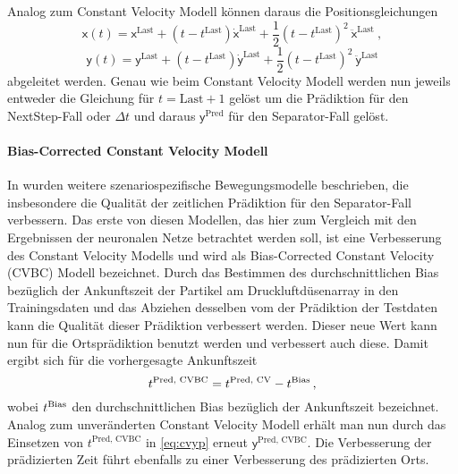 Analog zum Constant Velocity Modell können daraus die Positionsgleichungen 
% 
\begin{equation*}
    \mathsf{x}(t) = \mathsf{x}^{\text{Last}} + (t - t^{\text{Last}})\dot{\mathsf{x}}^{\text{Last}} 
    + \frac{1}{2} (t - t^{\text{Last}})^2 \: \ddot{\mathsf{x}}^{\text{Last}} \: , 
\end{equation*}
\begin{equation*}
    \mathsf{y}(t) = \mathsf{y}^{\text{Last}} + (t - t^{\text{Last}})\dot{\mathsf{y}}^{\text{Last}}
    + \frac{1}{2} (t - t^{\text{Last}})^2 \: \ddot{\mathsf{y}}^{\text{Last}}
\end{equation*}
% 
abgeleitet werden.
Genau wie beim Constant Velocity Modell werden nun jeweils entweder die Gleichung für \(t = \text{Last} + 1\) gelöst 
um die Prädiktion für den NextStep-Fall oder \(\Delta t \) und daraus \(\mathsf{y}^{\text{Pred}}\) für den Separator-Fall gelöst.


\paragraph{Bias-Corrected Constant Velocity Modell}

In \cite{Pfaff2018} wurden weitere szenariospezifische Bewegungsmodelle beschrieben, die insbesondere die Qualität der zeitlichen Prädiktion für den Separator-Fall verbessern.
Das erste von diesen Modellen, das hier zum Vergleich mit den Ergebnissen der neuronalen Netze betrachtet werden soll, ist eine Verbesserung des Constant Velocity Modells und wird als Bias-Corrected Constant Velocity (CVBC) Modell bezeichnet.
Durch das Bestimmen des durchschnittlichen Bias bezüglich der Ankunftszeit der Partikel am Druckluftdüsenarray in den Trainingsdaten und das Abziehen desselben vom der Prädiktion der Testdaten kann die Qualität dieser Prädiktion verbessert werden.
Dieser neue Wert kann nun für die Ortsprädiktion benutzt werden und verbessert auch diese.
Damit ergibt sich für die vorhergesagte Ankunftszeit
% 
\begin{equation*}
    t{^{\text{Pred, CVBC}}} = t{^{\text{Pred, CV}}} - t{^{\text{Bias}}} \, ,
\end{equation*}
% 
wobei \(t{^{\text{Bias}}}\) den durchschnittlichen Bias bezüglich der Ankunftszeit bezeichnet.
Analog zum unveränderten Constant Velocity Modell erhält man nun durch das Einsetzen von \(t^{\text{Pred, CVBC}}\) in \eqref{eq:cvyp} erneut \(\mathsf{y}^{\text{Pred, CVBC}}\).
Die Verbesserung der prädizierten Zeit führt ebenfalls zu einer Verbesserung des prädizierten Orts.


